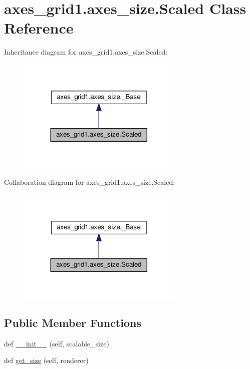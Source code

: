 \hypertarget{classaxes__grid1_1_1axes__size_1_1Scaled}{}\section{axes\+\_\+grid1.\+axes\+\_\+size.\+Scaled Class Reference}
\label{classaxes__grid1_1_1axes__size_1_1Scaled}


Inheritance diagram for axes\+\_\+grid1.\+axes\+\_\+size.\+Scaled\+:
\nopagebreak
\begin{figure}[H]
\begin{center}
\leavevmode
\includegraphics[width=224pt]{classaxes__grid1_1_1axes__size_1_1Scaled__inherit__graph}
\end{center}
\end{figure}


Collaboration diagram for axes\+\_\+grid1.\+axes\+\_\+size.\+Scaled\+:
\nopagebreak
\begin{figure}[H]
\begin{center}
\leavevmode
\includegraphics[width=224pt]{classaxes__grid1_1_1axes__size_1_1Scaled__coll__graph}
\end{center}
\end{figure}
\subsection*{Public Member Functions}
\begin{DoxyCompactItemize}
\item 
def \hyperlink{classaxes__grid1_1_1axes__size_1_1Scaled_ad942c758d495cf6d1f650ba40a4142cc}{\+\_\+\+\_\+init\+\_\+\+\_\+} (self, scalable\+\_\+size)
\item 
def \hyperlink{classaxes__grid1_1_1axes__size_1_1Scaled_a73affb87544858ab83202c7fbf035456}{get\+\_\+size} (self, renderer)
\end{DoxyCompactItemize}


